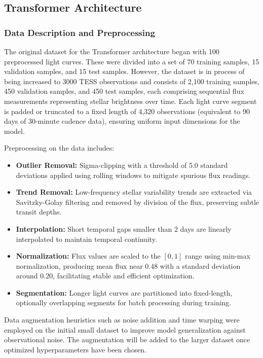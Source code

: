 \documentclass[letterpaper]{article} %
\begin{document}
\subsection{Transformer Architecture}
\subsubsection*{Data Description and Preprocessing}
The original dataset for the Transformer architecture began with 100 preprocessed light curves. These were divided into a set of 70 training samples, 15 validation samples, and 15 test samples. However, the dataset is in process of being increased to 3000 TESS observations and consists of 2,100 training samples, 450 validation samples, and 450 test samples, each comprising sequential flux measurements representing stellar brightness over time. Each light curve segment is padded or truncated to a fixed length of 4,320 observations (equivalent to 90 days of 30-minute cadence data), ensuring uniform input dimensions for the model.

Preprocessing on the data includes:

\begin{itemize}
    \item \textbf{Outlier Removal:} Sigma-clipping with a threshold of 5.0 standard deviations applied using rolling windows to mitigate spurious flux readings.
    \item \textbf{Trend Removal:} Low-frequency stellar variability trends are extracted via Savitzky-Golay filtering and removed by division of the flux, preserving subtle transit depths.
    \item \textbf{Interpolation:} Short temporal gaps smaller than 2 days are linearly interpolated to maintain temporal continuity.
    \item \textbf{Normalization:} Flux values are scaled to the \([0,1]\) range using min-max normalization, producing mean flux near 0.48 with a standard deviation around 0.20, facilitating stable and efficient optimization.
    \item \textbf{Segmentation:} Longer light curves are partitioned into fixed-length, optionally overlapping segments for batch processing during training.
\end{itemize}

Data augmentation heuristics such as noise addition and time warping were employed on the initial small dataset to improve model generalization against observational noise. The augmentation will be added to the larger dataset once optimized hyperparameters have been chosen.
\end{document}
